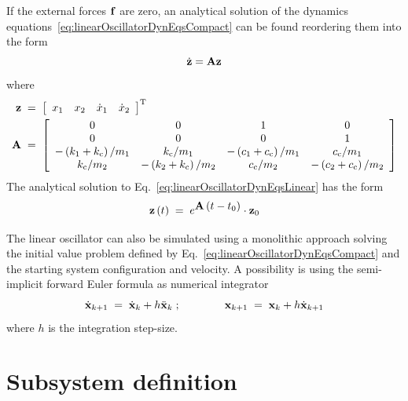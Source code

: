 \documentclass[fleqn,11pt]{article}
\newcommand{\plbr}[1]		{ \left( #1 \right) }
\newcommand{\sqbr}[1]		{ \left[ #1 \right] }
\newcommand{\mat}[2]		{ \sqbr{\begin{array}{ #1 } #2 \end{array}} }
\newcommand{\trans}			{^{\rm T}}
\newcommand{\eq}			{ \; = \; }
\newcommand{\timestep}		{ {h} }
\begin{document}
If the external forces $\bf f$ are zero, an analytical solution of the dynamics equations~\eqref{eq:linearOscillatorDynEqsCompact} can be found reordering them into the form
\begin{equation}
	\dot{\bf z} = {\bf A}{\bf z}
	\label{eq:linearOscillatorDynEqsLinear}
\end{equation}
where
\begin{align}
	\label{eq:linearOscillatorDynEqsLinearTermsz}
	{\bf z} &\eq \mat{cccc}{x_1 & x_2 & \dot{x}_1 & \dot{x}_2}\trans
	\\
	{\bf A} &\eq \mat{cccc}{
		0 &0 &1 &0 \\ 0 &0 &0 &1 \\
		-\plbr{k_1 + k_{\rm c}}/m_1 &k_{\rm c}/m_1 
		&-\plbr{c_1 + c_{\rm c}}/m_1 &c_{\rm c}/m_1 \\
		k_{\rm c}/m_2 &-\plbr{k_2 + k_{\rm c}}/m_2 
		&c_{\rm c}/m_2 &-\plbr{c_2 + c_{\rm c}}/m_2 }
	\label{eq:linearOscillatorDynEqsLinearTerms}
\end{align}
%
The analytical solution to Eq.~\eqref{eq:linearOscillatorDynEqsLinear} has the form
\begin{equation}
	{\bf z}\plbr{t} \eq e^{\displaystyle{\bf A}\plbr{t-t_0}} \cdot {\bf z}_0
	\label{eq:linearOscillatorDynEqsLinearSol}
\end{equation}

The linear oscillator can also be simulated using a monolithic approach solving the initial value problem defined by Eq.~\eqref{eq:linearOscillatorDynEqsCompact} and the starting system configuration and velocity.
A possibility is using the semi-implicit forward Euler formula as numerical integrator
\begin{equation}
	\dot{\bf x}_{k+1} \eq \dot{\bf x}_{k} + \timestep \ddot{\bf x}_{k}
	\;; \quad\quad\quad\quad
	{\bf x}_{k+1} \eq {\bf x}_{k} + \timestep \dot{\bf x}_{k+1}
	\label{eq:fwEuler}
\end{equation}
where $\timestep$ is the integration step-size.

\section{Subsystem definition}
\label{Schemes}
\end{document}
